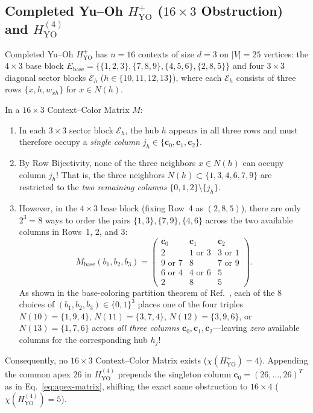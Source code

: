 \documentclass[aps,pra,reprint,superscriptaddress,longbibliography,nofootinbib,floatfix,10pt]{revtex4-2}
\theoremstyle{definition}\newtheorem{definition}[theorem]{Definition}
\theoremstyle{remark}\newtheorem{remark}[theorem]{Remark}
\newcommand{\YO}{\mathrm{YO}}\newcommand{\ip}[2]{\langle #1,#2\rangle}
\begin{document}
\subsection{Completed Yu--Oh \texorpdfstring{$H_{\YO}^+$}{HYO+} (\texorpdfstring{$16\times 3$}{16x3} Obstruction) and \texorpdfstring{$H_{\YO}^{(4)}$}{HYO(4)}}\label{sec:HYO}

Completed Yu--Oh $H_{\YO}^+$ has $n=16$ contexts of size $d=3$ on $|V|=25$ vertices: the $4\times 3$ base block $E_{\mathrm{base}}=\{\{1,2,3\},\{7,8,9\},\{4,5,6\},\{2,8,5\}\}$ and four $3\times 3$ diagonal sector blocks $\mathcal{E}_{h}$ ($h\in\{10,11,12,13\}$), where each $\mathcal{E}_h$ consists of three rows $\{x,h,w_{xh}\}$ for $x\in N(h)$.

In a $16\times 3$ Context--Color Matrix $M$:
\begin{enumerate}
\item In each $3\times 3$ sector block $\mathcal{E}_h$, the hub $h$ appears in all three rows and must therefore occupy a \emph{single column} $j_h\in\{\mathbf{c}_0,\mathbf{c}_1,\mathbf{c}_2\}$.
\item By Row Bijectivity, none of the three neighbors $x\in N(h)$ can occupy column $j_h$! That is, the three neighbors $N(h)\subset\{1,3,4,6,7,9\}$ are restricted to the \emph{two remaining columns} $\{0,1,2\}\setminus\{j_h\}$.
\item However, in the $4\times 3$ base block (fixing Row~4 as $(2,8,5)$), there are only $2^3=8$ ways to order the pairs $\{1,3\},\{7,9\},\{4,6\}$ across the two available columns in Rows~1, 2, and 3:
\begin{equation}\label{eq:YO-base-matrix}
M_{\mathrm{base}}(b_1,b_2,b_3)=\begin{pmatrix}
\mathbf{c}_0 & \mathbf{c}_1 & \mathbf{c}_2\\\hline
2 & 1\text{ or }3 & 3\text{ or }1\\
9\text{ or }7 & 8 & 7\text{ or }9\\
6\text{ or }4 & 4\text{ or }6 & 5\\
2 & 8 & 5
\end{pmatrix}.
\end{equation}
As shown in the base-coloring partition theorem of Ref.~\cite{svozil2026contexts}, each of the $8$ choices of $(b_1,b_2,b_3)\in\{0,1\}^3$ places one of the four triples $N(10)=\{1,9,4\}$, $N(11)=\{3,7,4\}$, $N(12)=\{3,9,6\}$, or $N(13)=\{1,7,6\}$ across \emph{all three columns} $\mathbf{c}_0,\mathbf{c}_1,\mathbf{c}_2$—leaving \emph{zero} available columns for the corresponding hub $h_j$!
\end{enumerate}
Consequently, no $16\times 3$ Context--Color Matrix exists ($\chi(H_{\YO}^+)=4$). Appending the common apex $26$ in $H_{\YO}^{(4)}$ prepends the singleton column $\mathbf{c}_0=(26,\ldots,26)^T$ as in Eq.~\eqref{eq:apex-matrix}, shifting the exact same obstruction to $16\times 4$ ($\chi(H_{\YO}^{(4)})=5$).
\end{document}
